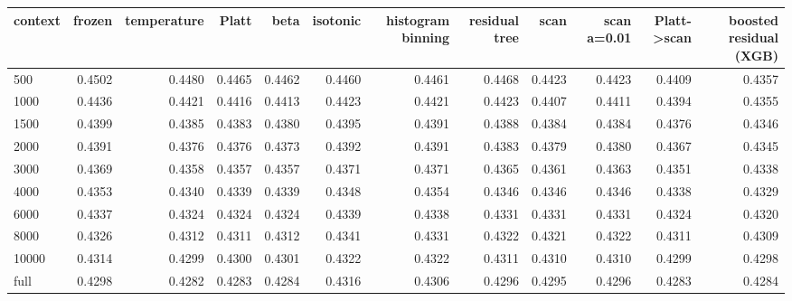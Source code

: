 \begin{tabular}{lrrrrrrrrrrr}
\toprule
context & frozen & temperature & Platt & beta & isotonic & histogram binning & residual tree & scan & scan a=0.01 & Platt->scan & boosted residual (XGB) \\
\midrule
500 & 0.4502 & 0.4480 & 0.4465 & 0.4462 & 0.4460 & 0.4461 & 0.4468 & 0.4423 & 0.4423 & 0.4409 & 0.4357 \\
1000 & 0.4436 & 0.4421 & 0.4416 & 0.4413 & 0.4423 & 0.4421 & 0.4423 & 0.4407 & 0.4411 & 0.4394 & 0.4355 \\
1500 & 0.4399 & 0.4385 & 0.4383 & 0.4380 & 0.4395 & 0.4391 & 0.4388 & 0.4384 & 0.4384 & 0.4376 & 0.4346 \\
2000 & 0.4391 & 0.4376 & 0.4376 & 0.4373 & 0.4392 & 0.4391 & 0.4383 & 0.4379 & 0.4380 & 0.4367 & 0.4345 \\
3000 & 0.4369 & 0.4358 & 0.4357 & 0.4357 & 0.4371 & 0.4371 & 0.4365 & 0.4361 & 0.4363 & 0.4351 & 0.4338 \\
4000 & 0.4353 & 0.4340 & 0.4339 & 0.4339 & 0.4348 & 0.4354 & 0.4346 & 0.4346 & 0.4346 & 0.4338 & 0.4329 \\
6000 & 0.4337 & 0.4324 & 0.4324 & 0.4324 & 0.4339 & 0.4338 & 0.4331 & 0.4331 & 0.4331 & 0.4324 & 0.4320 \\
8000 & 0.4326 & 0.4312 & 0.4311 & 0.4312 & 0.4341 & 0.4331 & 0.4322 & 0.4321 & 0.4322 & 0.4311 & 0.4309 \\
10000 & 0.4314 & 0.4299 & 0.4300 & 0.4301 & 0.4322 & 0.4322 & 0.4311 & 0.4310 & 0.4310 & 0.4299 & 0.4298 \\
full & 0.4298 & 0.4282 & 0.4283 & 0.4284 & 0.4316 & 0.4306 & 0.4296 & 0.4295 & 0.4296 & 0.4283 & 0.4284 \\
\bottomrule
\end{tabular}
